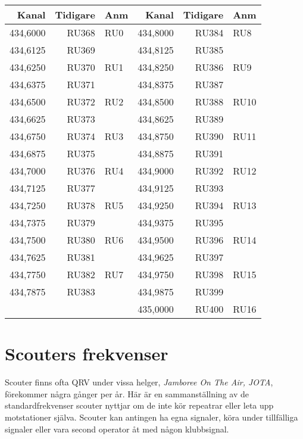 \clearpage
\begin{longtable}{rrl|rrl}
\textbf{Kanal} & \textbf{Tidigare} & \textbf{Anm}   
&  \textbf{Kanal} & \textbf{Tidigare} & \textbf{Anm} \\ \hline
	434,6000 & RU368 & RU0  & 434,8000 & RU384 & RU8  \\
	434,6125 & RU369 &      & 434,8125 & RU385 &      \\
	434,6250 & RU370 & RU1  & 434,8250 & RU386 & RU9  \\
	434,6375 & RU371 &      & 434,8375 & RU387 &      \\
	434,6500 & RU372 & RU2  & 434,8500 & RU388 & RU10 \\
	434,6625 & RU373 &      & 434,8625 & RU389 &      \\
	434,6750 & RU374 & RU3  & 434,8750 & RU390 & RU11 \\
	434,6875 & RU375 &      & 434,8875 & RU391 &      \\
	434,7000 & RU376 & RU4  & 434,9000 & RU392 & RU12 \\
	434,7125 & RU377 &      & 434,9125 & RU393 &      \\
	434,7250 & RU378 & RU5  & 434,9250 & RU394 & RU13 \\
	434,7375 & RU379 &      & 434,9375 & RU395 &      \\
	434,7500 & RU380 & RU6  & 434,9500 & RU396 & RU14 \\
	434,7625 & RU381 &      & 434,9625 & RU397 &      \\
	434,7750 & RU382 & RU7  & 434,9750 & RU398 & RU15 \\
	434,7875 & RU383 &      & 434,9875 & RU399 &      \\
	         &       &      & 435,0000 & RU400 & RU16 \\
\end{longtable}

\clearpage

\section{Scouters frekvenser}

Scouter finns ofta QRV under vissa helger, \textit{Jamboree On The Air, JOTA}, förekommer några gånger per år. Här är en sammanställning av de standardfrekvenser scouter nyttjar om de inte kör repeatrar eller leta upp motstationer själva. Scouter kan antingen ha egna signaler, köra under tillfälliga signaler eller vara second operator åt med någon klubbsignal.

